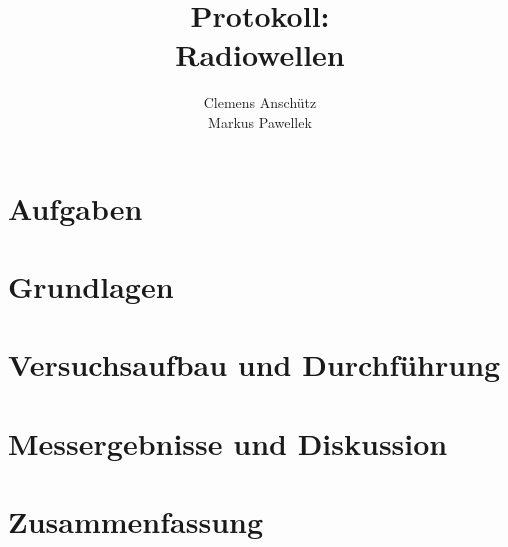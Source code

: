 \documentclass[11pt, twoside, a4paper]{article}
\title{Protokoll: \\ Radiowellen}
\author{Clemens Anschütz \\ Markus Pawellek}
\begin{document}
	
	\maketitle
	\newpage

	\section{Aufgaben} %
	\label{sec:aufgaben}

		


	\newpage

	\section{Grundlagen} %
	\label{sec:grundlagen}
	
		


	\newpage

	\section{Versuchsaufbau und Durchführung} %
	\label{sec:versuchsaufbau_und_durchf_hrung}

		


	\newpage

	\section{Messergebnisse und Diskussion} %
	\label{sec:messergebnisse}

		
	

	\newpage

	\section{Zusammenfassung} %
	\label{sec:zusammenfassung}
	
		


	\newpage

	

	\newpage
\end{document}
